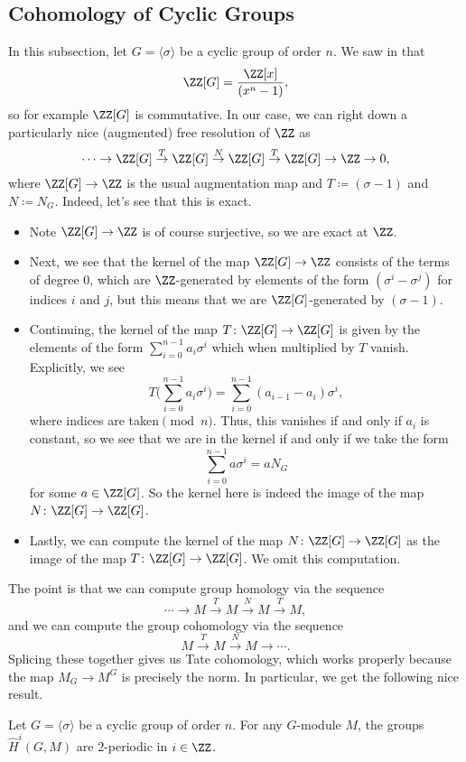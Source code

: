 \documentclass[../notes.tex]{subfiles}
\begin{document}
\subsection{Cohomology of Cyclic Groups}
In this subsection, let $G=\langle\sigma\rangle$ be a cyclic group of order $n$. We saw in  that
\[\ZZ[G]=\frac{\ZZ[x]}{\left(x^n-1\right)},\]
so for example $\ZZ[G]$ is commutative. In our case, we can right down a particularly nice (augmented) free resolution of $\ZZ$ as
\[\cdots\to\ZZ[G]\stackrel T\to\ZZ[G]\stackrel N\to\ZZ[G]\stackrel T\to\ZZ[G]\to\ZZ\to0,\]
where $\ZZ[G]\to\ZZ$ is the usual augmentation map and $T\coloneqq(\sigma-1)$ and $N\coloneqq N_G$. Indeed, let's see that this is exact.
\begin{itemize}
	\item Note $\ZZ[G]\to\ZZ$ is of course surjective, so we are exact at $\ZZ$.
	\item Next, we see that the kernel of the map $\ZZ[G]\to\ZZ$ consists of the terms of degree $0$, which are $\ZZ$-generated by elements of the form $\left(\sigma^i-\sigma^j\right)$ for indices $i$ and $j$, but this means that we are $\ZZ[G]$-generated by $(\sigma-1)$.
	\item Continuing, the kernel of the map $T\colon\ZZ[G]\to\ZZ[G]$ is given by the elements of the form $\sum_{i=0}^{n-1}a_i\sigma^i$ which when multiplied by $T$ vanish. Explicitly, we see
	\[T\Bigg(\sum_{i=0}^{n-1}a_i\sigma^i\Bigg)=\sum_{i=0}^{n-1}\left(a_{i-1}-a_i\right)\sigma^i,\]
	where indices are taken$\pmod n$. Thus, this vanishes if and only if $a_i$ is constant, so we see that we are in the kernel if and only if we take the form
	\[\sum_{i=0}^{n-1}a\sigma^i=aN_G\]
	for some $a\in\ZZ[G]$. So the kernel here is indeed the image of the map $N\colon\ZZ[G]\to\ZZ[G]$.
	\item Lastly, we can compute the kernel of the map $N\colon\ZZ[G]\to\ZZ[G]$ as the image of the map $T\colon\ZZ[G]\to\ZZ[G]$. We omit this computation.
\end{itemize}
The point is that we can compute group homology via the sequence
\[\cdots\to M\stackrel T\to M\stackrel N\to M\stackrel T\to M,\]
and we can compute the group cohomology via the sequence
\[M\stackrel T\to M\stackrel N\to M\to\cdots.\]
Splicing these together gives us Tate cohomology, which works properly because the map $M_G\to M^G$ is precisely the norm. In particular, we get the following nice result.
\begin{proposition} \label{prop:cyclic-cohomology}
	Let $G=\langle\sigma\rangle$ be a cyclic group of order $n$. For any $G$-module $M$, the groups $\widehat H^i(G,M)$ are $2$-periodic in $i\in\ZZ$.
\end{proposition}
\end{document}
